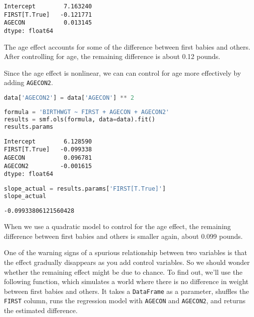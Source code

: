 \begin{lstlisting}[style=output]
Intercept        7.163240
FIRST[T.True]   -0.121771
AGECON           0.013145
dtype: float64
\end{lstlisting}

The age effect accounts for some of the difference between first babies
and others. After controlling for age, the remaining difference is about
0.12 pounds.

Since the age effect is nonlinear, we can can control for age more
effectively by adding \passthrough{\lstinline!AGECON2!}.

\begin{lstlisting}[language=Python,style=source]
data['AGECON2'] = data['AGECON'] ** 2
\end{lstlisting}

\begin{lstlisting}[language=Python,style=source]
formula = 'BIRTHWGT ~ FIRST + AGECON + AGECON2'
results = smf.ols(formula, data=data).fit()
results.params
\end{lstlisting}

\begin{lstlisting}[style=output]
Intercept        6.128590
FIRST[T.True]   -0.099338
AGECON           0.096781
AGECON2         -0.001615
dtype: float64
\end{lstlisting}

\begin{lstlisting}[language=Python,style=source]
slope_actual = results.params['FIRST[T.True]']
slope_actual
\end{lstlisting}

\begin{lstlisting}[style=output]
-0.09933806121560428
\end{lstlisting}

When we use a quadratic model to control for the age effect, the
remaining difference between first babies and others is smaller again,
about 0.099 pounds.

One of the warning signs of a spurious relationship between two
variables is that the effect gradually disappears as you add control
variables. So we should wonder whether the remaining effect might be due
to chance. To find out, we'll use the following function, which
simulates a world where there is no difference in weight between first
babies and others. It takes a \passthrough{\lstinline!DataFrame!} as a
parameter, shuffles the \passthrough{\lstinline!FIRST!} column, runs the
regression model with \passthrough{\lstinline!AGECON!} and
\passthrough{\lstinline!AGECON2!}, and returns the estimated difference.

